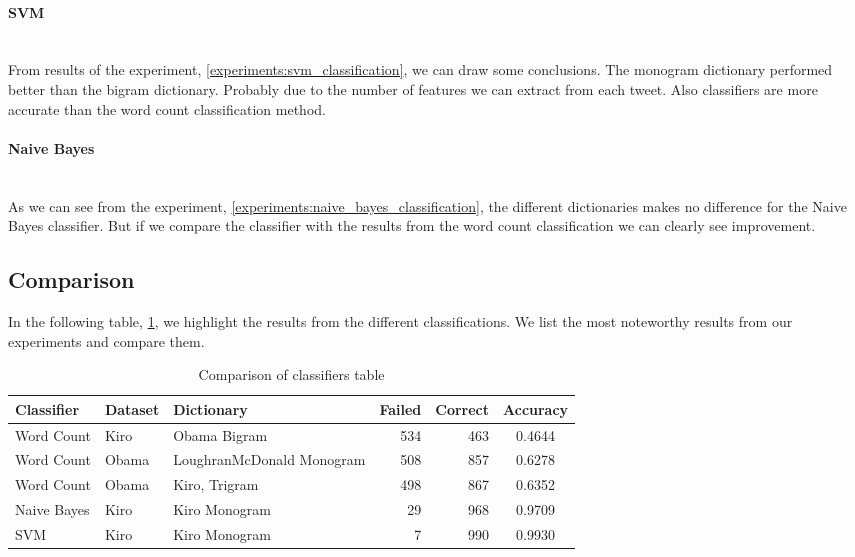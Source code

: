 \paragraph{SVM}\label{results:svm_classification}
\hspace{0pt}\\
From results of the experiment, \ref{experiments:svm_classification}, we can draw
some conclusions. The monogram dictionary performed
better than the bigram dictionary. Probably due to the number of features we
can extract from each tweet. Also classifiers are more accurate than the word
count classification method.

\paragraph{Naive Bayes}\label{results:naive_bayes_classification}
\hspace{0pt}\\
As we can see from the experiment,
\ref{experiments:naive_bayes_classification}, the different dictionaries makes
no difference for the Naive Bayes classifier. But if we compare the classifier
with the results from the word count classification we can clearly see
improvement. 

\subsection{Comparison}\label{results:comparison}
In the following table, \ref{tbl:classification_comparison}, we highlight the
results from the different classifications. We list the most noteworthy results
from our experiments and compare them.

\begin{table}
\centering
\label{tbl:classification_comparison}
\caption{Comparison of classifiers table}
\begin{tabular}{ l l p{3.5cm} r r c }
Classifier & Dataset & Dictionary & Failed & Correct & Accuracy \\
\hline
Word Count & Kiro & Obama Bigram & 534 & 463 & 0.4644 \\
Word Count & Obama & LoughranMcDonald Monogram & 508 & 857 & 0.6278 \\
Word Count & Obama & Kiro, Trigram & 498 & 867 & 0.6352 \\
Naive Bayes & Kiro & Kiro Monogram & 29 & 968 & 0.9709 \\
SVM & Kiro & Kiro Monogram & 7 & 990 & 0.9930 \\
\end{tabular}
\end{table}

